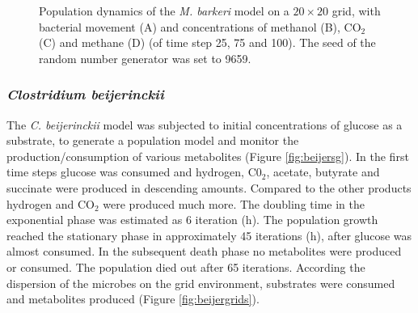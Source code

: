 \begin{figure}[h!]
{\begin{minipage}[t]{0.3\textwidth}
  \end{minipage}
  }
  \caption{Population dynamics of the \emph{M. barkeri} model on a $20\times20$ grid, with bacterial movement (A) and concentrations of methanol (B), CO$_2$ (C) and methane (D) (of time step 25, 75 and 100). The seed of the random number generator was set to 9659.}
  \label{fig:barkerigrids}
\end{figure}


\subsubsection{\textit{Clostridium beijerinckii}}
The \textit{C. beijerinckii} model was subjected to initial concentrations of glucose as a substrate, to generate a population model and monitor the production/consumption of various metabolites (Figure \hyperref[fig:beijersg]{\ref{fig:beijersg}}). In the first time steps glucose was consumed and hydrogen, C0$_2$, acetate, butyrate and succinate were produced in descending amounts. 
Compared to the other products hydrogen and CO$_2$ were produced much more.
The doubling time in the exponential phase was estimated as 6 iteration (h).
The population growth reached the stationary phase in approximately 45 iterations (h), after glucose was almost consumed. In the subsequent death phase no metabolites were produced or consumed. The population died out after 65 iterations.
According the dispersion of the microbes on the grid environment, substrates were consumed and metabolites produced (Figure \hyperref[fig:beijergrids]{\ref{fig:beijergrids}}).
